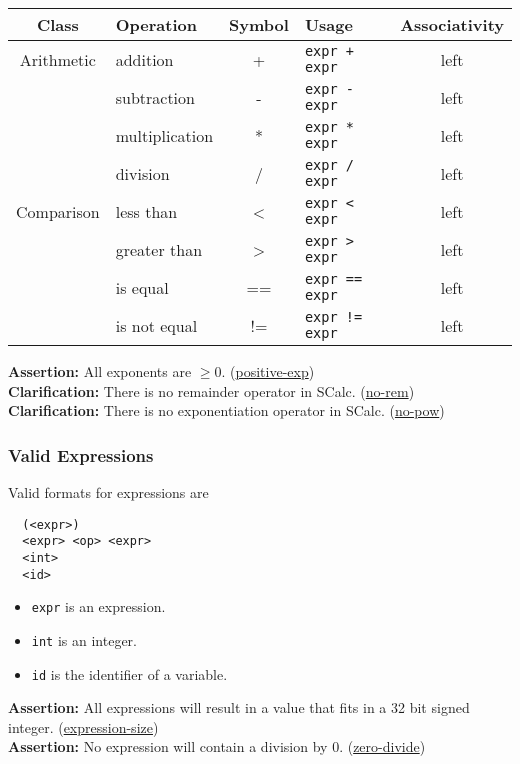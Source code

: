 \documentclass{article}
\newcommand{\code}[1]{\texttt{\textmd{#1}}}
\newcommand{\assertion}[2]{\textbf{Assertion: }#1 (\hyperlink{#2}{#2})}
\newcommand{\clarification}[2]{\textbf{Clarification: }#1 (\hyperlink{#2}{#2})}
\begin{document}
\begin{center}
  \begin{tabular}{|c|l|c|l|c|}
    \hline
    \textbf{Class} & \textbf{Operation} & \textbf{Symbol} & \textbf{Usage} &
    \textbf{Associativity} \\
    \hline
    Arithmetic
    &addition	    & + & \texttt{expr + expr} & left \\
    &subtraction    & - & \texttt{expr - expr} & left \\
    &multiplication & * & \texttt{expr * expr} & left \\
    &division       & / & \texttt{expr / expr} & left \\
    \hline
    Comparison
    &less than      & <  & \texttt{expr < expr}  & left \\
    &greater than   & >  & \texttt{expr > expr}  & left \\
    &is equal       & == & \texttt{expr == expr} & left \\
    &is not equal   & != & \texttt{expr != expr} & left \\
    \hline
  \end{tabular}
\end{center}

\assertion{All exponents are $\geq 0$.}{positive-exp}\\
\clarification{There is no remainder operator in SCalc.}{no-rem}\\
\clarification{There is no exponentiation operator in SCalc.}{no-pow}

\subsubsection{Valid Expressions}
Valid formats for expressions are
\begin{lstlisting}
  (<expr>)
  <expr> <op> <expr>
  <int>
  <id>
\end{lstlisting}

\begin{itemize}
  \item \code{expr} is an expression.
  \item \code{int} is an integer.
  \item \code{id} is the identifier of a variable.
\end{itemize}

\assertion{All expressions will result in a value that fits in a 32 bit signed integer.}
{expression-size}\\
\assertion{No expression will contain a division by 0.} {zero-divide}
\end{document}
